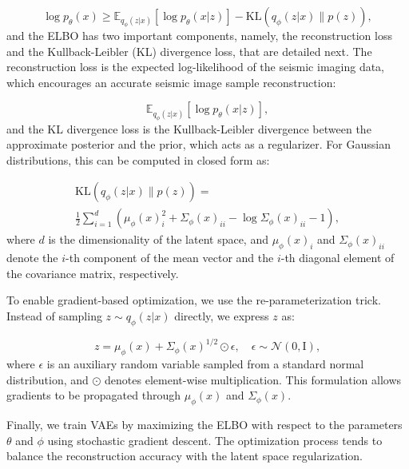 \documentclass{ieeeaccess}
\begin{document}
\begin{equation}
\log p_\theta(x) \geq \mathbb{E}_{q_\phi(z | x)} \left[ \log p_\theta(x | z) \right] - \text{KL}(q_\phi(z | x) \parallel p(z)),
\end{equation}
and the ELBO has two important components, namely, the reconstruction loss and the Kullback-Leibler (KL) divergence loss, that are detailed next. The reconstruction loss is the expected log-likelihood of the seismic imaging data, which encourages an accurate seismic image sample reconstruction:

\begin{equation}
\mathbb{E}_{q_\phi(z | x)} \left[ \log p_\theta(x | z) \right],
\end{equation}
and the KL divergence loss is the Kullback-Leibler divergence between the approximate posterior and the prior, which acts as a regularizer. For Gaussian distributions, this can be computed in closed form as:

\begin{equation}
\begin{aligned}
\text{KL}(q_\phi(z | x) \parallel p(z))
=  \\
\frac{1}{2} \sum_{i=1}^{d} \left( \mu_\phi(x)_i^2 + \Sigma_\phi(x)_{ii} - \log \Sigma_\phi(x)_{ii} - 1 \right),
\end{aligned}
\end{equation}
where $d$ is the dimensionality of the latent space, and $\mu_\phi(x)_i$ and $\Sigma_\phi(x)_{ii}$ denote the $i$-th component of the mean vector and the $i$-th diagonal element of the covariance matrix, respectively.

To enable gradient-based optimization, we use the re-parameterization trick. Instead of sampling $z \sim q_\phi(z | x)$ directly, we express $z$ as:

\begin{equation}
z = \mu_\phi(x) + \Sigma_\phi(x)^{1/2} \odot \epsilon, \quad \epsilon \sim \mathcal{N}(0, \mathrm{I}),
\end{equation}
where $\epsilon$ is an auxiliary random variable sampled from a standard normal distribution, and $\odot$ denotes element-wise multiplication. This formulation allows gradients to be propagated through $\mu_\phi(x)$ and $\Sigma_\phi(x)$.

Finally, we train VAEs by maximizing the ELBO with respect to the parameters $\theta$ and $\phi$ using stochastic gradient descent. The optimization process tends to balance the reconstruction accuracy with the latent space regularization.
\end{document}

